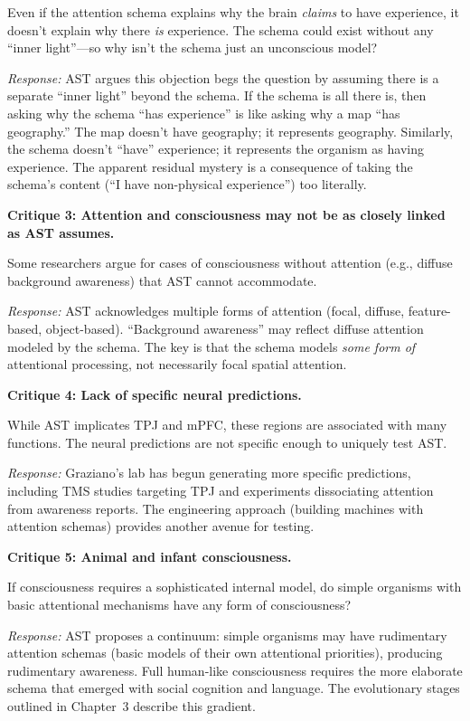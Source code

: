 \documentclass[11pt,a4paper]{report}
\begin{document}
Even if the attention schema explains why the brain \emph{claims} to have experience, it doesn't explain why there \emph{is} experience. The schema could exist without any ``inner light''---so why isn't the schema just an unconscious model?

\emph{Response:} AST argues this objection begs the question by assuming there is a separate ``inner light'' beyond the schema. If the schema is all there is, then asking why the schema ``has experience'' is like asking why a map ``has geography.'' The map doesn't have geography; it represents geography. Similarly, the schema doesn't ``have'' experience; it represents the organism as having experience. The apparent residual mystery is a consequence of taking the schema's content (``I have non-physical experience'') too literally.

\textbf{Critique 3: Attention and consciousness may not be as closely linked as AST assumes.}

Some researchers argue for cases of consciousness without attention (e.g., diffuse background awareness) that AST cannot accommodate.

\emph{Response:} AST acknowledges multiple forms of attention (focal, diffuse, feature-based, object-based). ``Background awareness'' may reflect diffuse attention modeled by the schema. The key is that the schema models \emph{some form of} attentional processing, not necessarily focal spatial attention.

\textbf{Critique 4: Lack of specific neural predictions.}

While AST implicates TPJ and mPFC, these regions are associated with many functions. The neural predictions are not specific enough to uniquely test AST.

\emph{Response:} Graziano's lab has begun generating more specific predictions, including TMS studies targeting TPJ and experiments dissociating attention from awareness reports. The engineering approach (building machines with attention schemas) provides another avenue for testing.

\textbf{Critique 5: Animal and infant consciousness.}

If consciousness requires a sophisticated internal model, do simple organisms with basic attentional mechanisms have any form of consciousness?

\emph{Response:} AST proposes a continuum: simple organisms may have rudimentary attention schemas (basic models of their own attentional priorities), producing rudimentary awareness. Full human-like consciousness requires the more elaborate schema that emerged with social cognition and language. The evolutionary stages outlined in Chapter~3 describe this gradient.
\end{document}
